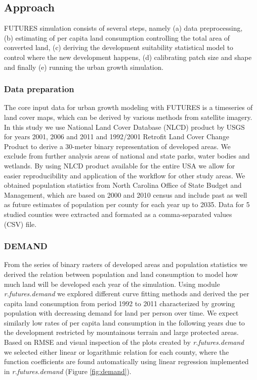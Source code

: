 \documentclass{isprs}
\begin{document}
\subsection{Approach}
FUTURES simulation consists of several steps, namely
(a) data preprocessing,
(b) estimating of per capita land consumption controlling the total area of converted land,
(c) deriving the development suitability statistical model to control where the new development happens,
(d) calibrating patch size and shape and finally (e) running the urban growth simulation.

\subsubsection{Data preparation}
The core input data for urban growth modeling with FUTURES is a timeseries of land cover maps,
which can be derived by various methods from satellite imagery. In this study
we use National Land Cover Database (NLCD) product by USGS for years 2001, 2006 and 2011
and 1992/2001 Retro\-fit Land Cover Change Product to derive a 30-meter binary representation
of developed areas. We exclude from further analysis areas of national and state parks,
water bodies and wetlands. By using NLCD product available for the entire USA we
allow for easier reproducibility and application of the workflow for other study areas.
We obtained population statistics from North Carolina Office of State Budget and Management,
which are based on 2000 and 2010 census and include past as well as future estimates
of population per county for each year up to 2035. Data for 5 studied counties
were extracted and formated as a comma-separated values (CSV) file.

\subsubsection{DEMAND}
From the series of binary rasters of developed areas and
population statistics we derived the relation between population
and land consumption to model how much land will be developed
each year of the simulation.
Using module \emph{r.futures.demand} we explored different curve fitting
methods and derived the per capita land consumption
from period 1992 to 2011 characterized by
growing population with decreasing demand for land per person over time.
We expect similarly low rates of per capita land consumption
in the following years due to the development restricted by mountainous terrain and
large protected areas.
Based on RMSE and visual inspection of the plots
created by \emph{r.futures.demand} we
selected either linear or logarithmic relation %
for each county, where the function coefficients are found automatically
using linear regression implemented in \emph{r.futures.demand} (Figure \ref{fig:demand}).
\end{document}
